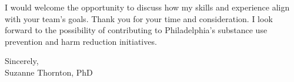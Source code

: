 \documentclass[12pt]{letter}
\begin{document}
\begin{letter}{}
I would welcome the opportunity to discuss how my skills and experience align with your team's goals. Thank you for your time and consideration. I look forward to the possibility of contributing to Philadelphia's substance use prevention and harm reduction initiatives.


\noindent Sincerely,\\ \vspace{2ex} 
\noindent Suzanne Thornton, PhD

\end{letter}
\end{document}
